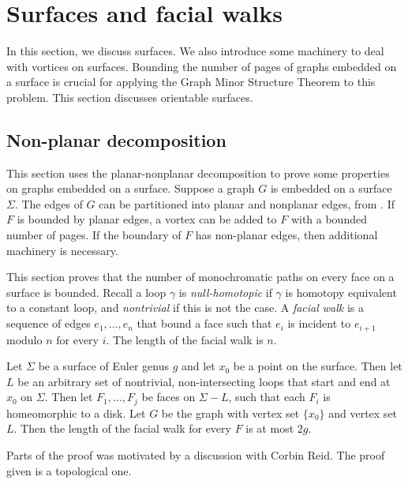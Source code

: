 
\section{Surfaces and facial walks}
In this section, we discuss surfaces. We also introduce some machinery to deal with vortices on surfaces. Bounding the number of pages of graphs embedded on a surface is crucial for applying the Graph Minor Structure Theorem to this problem. This section discusses orientable surfaces.
\subsection{Non-planar decomposition}

This section uses the planar-nonplanar decomposition to prove some properties on graphs embedded on a surface. Suppose a graph \(G\) is embedded on a surface $\Sigma$. The edges of $G$ can be partitioned into planar and nonplanar edges, from \textcite{heathPagenumberGenusGraphs1992}. If \(F\) is bounded by planar edges, a vortex can be added to \(F\) with a bounded number of pages. If the boundary of $F$ has non-planar edges, then additional machinery is necessary.

This section proves that the number of monochromatic paths on every face on a surface is bounded. Recall a loop $\gamma$ is \textit{null-homotopic} if $\gamma$ is homotopy equivalent to a constant loop, and \textit{nontrivial} if this is not the case. A \textit{facial walk} is a sequence of edges \(e_1, \ldots, e_n\) that bound a face such that \(e_i\) is incident to \(e_{i + 1}\) modulo \(n\) for every \(i\). The length of the facial walk is \(n\).

\begin{lemma}\label{lem:orientable_facial_walks}
	Let \(\Sigma \) be a surface of Euler genus \(g\) and let \(x_0\) be a point on the surface. Then let \(L\) be an arbitrary set of nontrivial, non-intersecting loops that start and end at \(x_0\) on \(\Sigma \). Then let \(F_1, \ldots, F_j\) be faces on \(\Sigma - L\), such that each \(F_i\) is homeomorphic to a disk. Let $G$ be the graph with vertex set $\{x_0 \}$ and vertex set $L$. Then the length of the facial walk for every \(F\) is at most \(2g\).
\end{lemma}

Parts of the proof was motivated by a discussion with Corbin Reid. The proof given is a topological one.

